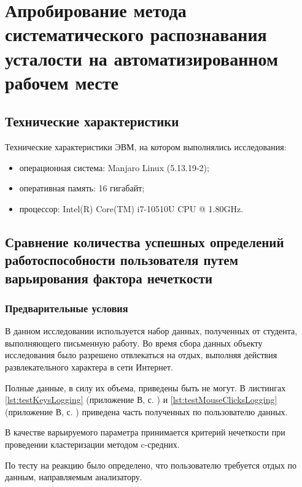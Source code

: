 \section{Апробирование метода систематического распознавания усталости на автоматизированном рабочем месте}

\subsection{Технические характеристики}

Технические характеристики ЭВМ, на котором выполнялись исследования:

\begin{itemize}[leftmargin=1.6\parindent, after=\vspace{5pt}]
\item операционная система: Manjaro Linux (5.13.19-2);
\item оперативная память: 16 гигабайт;
\item процессор: Intel(R) Core(TM) i7-10510U CPU @ 1.80GHz.
\end{itemize}

\subsection{Сравнение количества успешных определений работоспособности пользователя путем варьирования фактора нечеткости}

\subsubsection{Предварительные условия}

В данном исследовании используется набор данных, полученных от студента, выполняющего письменную работу. Во время сбора данных объекту исследования было разрешено отвлекаться на отдых, выполняя действия развлекательного характера в сети Интернет.

Полные данные, в силу их объема, приведены быть не могут. В листингах \ref{lst:testKeysLogging} (приложение В, с. \pageref{chp:application-c}) и \ref{lst:testMouseClicksLogging} (приложение В, с. \pageref{chp:application-c}) приведена часть полученных по пользователю данных.

В качестве варьируемого параметра принимается критерий нечеткости при проведении кластеризации методом c-средних.

По тесту на реакцию было определено, что пользователю требуется отдых по данным, направляемым анализатору.

